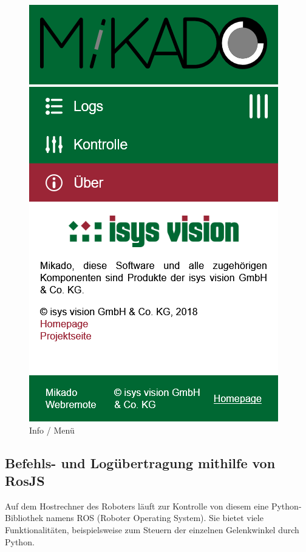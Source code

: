 \begin{figure}[H]
\begin{center}
\begin{minipage}{0.3\textwidth}
			\includegraphics[width=\textwidth]{media/webremote-info.png}
			\caption{Info / Menü}
			\label{fig:webremote-info}
		\end{minipage}
	\end{center}
\end{figure}


\subsection{Befehls- und Logübertragung mithilfe von RosJS}

Auf dem Hostrechner des Roboters läuft zur Kontrolle von diesem eine Python-Bibliothek
namens ROS (Roboter Operating System). Sie bietet viele Funktionalitäten, beispielsweise
zum Steuern der einzelnen Gelenkwinkel durch Python.


